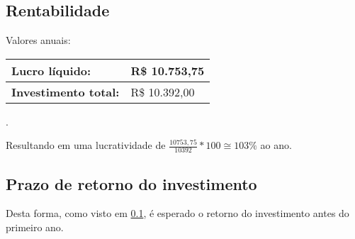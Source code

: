   \subsection{Rentabilidade}\label{rentabilidade}
  
  Valores anuais:
  \newline \newline
  \begin{tabular}{| l | l |}
    \hline
    \textbf{Lucro líquido:} & R\$ 10.753,75 \\ \hline
    \textbf{Investimento total:} & R\$ 10.392,00 \\ \hline
  \end{tabular}
  
  .\newline \newline
  
  Resultando em uma lucratividade de $\frac{10753,75}{10392}*100 \cong 103\%$ ao ano.
  
  \subsection{Prazo de retorno do investimento}
  
  Desta forma, como visto em \ref{rentabilidade}, é esperado o retorno do investimento antes do primeiro ano.
